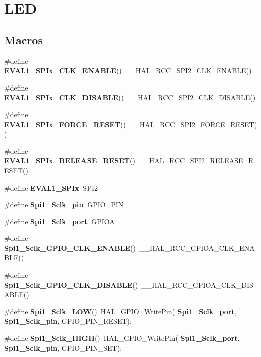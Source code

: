 \section{L\+ED}
\label{group___l_e_d}
\subsection*{Macros}
\begin{DoxyCompactItemize}
\item 
\#define \textbf{ E\+V\+A\+L1\+\_\+\+S\+P\+Ix\+\_\+\+C\+L\+K\+\_\+\+E\+N\+A\+B\+LE}()~\+\_\+\+\_\+\+H\+A\+L\+\_\+\+R\+C\+C\+\_\+\+S\+P\+I2\+\_\+\+C\+L\+K\+\_\+\+E\+N\+A\+B\+LE()
\item 
\#define \textbf{ E\+V\+A\+L1\+\_\+\+S\+P\+Ix\+\_\+\+C\+L\+K\+\_\+\+D\+I\+S\+A\+B\+LE}()~\+\_\+\+\_\+\+H\+A\+L\+\_\+\+R\+C\+C\+\_\+\+S\+P\+I2\+\_\+\+C\+L\+K\+\_\+\+D\+I\+S\+A\+B\+LE()
\item 
\#define \textbf{ E\+V\+A\+L1\+\_\+\+S\+P\+Ix\+\_\+\+F\+O\+R\+C\+E\+\_\+\+R\+E\+S\+ET}()~\+\_\+\+\_\+\+H\+A\+L\+\_\+\+R\+C\+C\+\_\+\+S\+P\+I2\+\_\+\+F\+O\+R\+C\+E\+\_\+\+R\+E\+S\+ET()
\item 
\#define \textbf{ E\+V\+A\+L1\+\_\+\+S\+P\+Ix\+\_\+\+R\+E\+L\+E\+A\+S\+E\+\_\+\+R\+E\+S\+ET}()~\+\_\+\+\_\+\+H\+A\+L\+\_\+\+R\+C\+C\+\_\+\+S\+P\+I2\+\_\+\+R\+E\+L\+E\+A\+S\+E\+\_\+\+R\+E\+S\+ET()
\item 
\#define \textbf{ E\+V\+A\+L1\+\_\+\+S\+P\+Ix}~S\+P\+I2
\item 
\#define \textbf{ Spi1\+\_\+\+Sclk\+\_\+pin}~G\+P\+I\+O\+\_\+\+P\+I\+N\+\_
\item 
\#define \textbf{ Spi1\+\_\+\+Sclk\+\_\+port}~G\+P\+I\+OA
\item 
\#define \textbf{ Spi1\+\_\+\+Sclk\+\_\+\+G\+P\+I\+O\+\_\+\+C\+L\+K\+\_\+\+E\+N\+A\+B\+LE}()~\+\_\+\+\_\+\+H\+A\+L\+\_\+\+R\+C\+C\+\_\+\+G\+P\+I\+O\+A\+\_\+\+C\+L\+K\+\_\+\+E\+N\+A\+B\+LE()
\item 
\#define \textbf{ Spi1\+\_\+\+Sclk\+\_\+\+G\+P\+I\+O\+\_\+\+C\+L\+K\+\_\+\+D\+I\+S\+A\+B\+LE}()~\+\_\+\+\_\+\+H\+A\+L\+\_\+\+R\+C\+C\+\_\+\+G\+P\+I\+O\+A\+\_\+\+C\+L\+K\+\_\+\+D\+I\+S\+A\+B\+LE()
\item 
\#define \textbf{ Spi1\+\_\+\+Sclk\+\_\+\+L\+OW}()~H\+A\+L\+\_\+\+G\+P\+I\+O\+\_\+\+Write\+Pin(\textbf{ Spi1\+\_\+\+Sclk\+\_\+port},\textbf{ Spi1\+\_\+\+Sclk\+\_\+pin}, G\+P\+I\+O\+\_\+\+P\+I\+N\+\_\+\+R\+E\+S\+ET);
\item 
\#define \textbf{ Spi1\+\_\+\+Sclk\+\_\+\+H\+I\+GH}()~H\+A\+L\+\_\+\+G\+P\+I\+O\+\_\+\+Write\+Pin(\textbf{ Spi1\+\_\+\+Sclk\+\_\+port},\textbf{ Spi1\+\_\+\+Sclk\+\_\+pin}, G\+P\+I\+O\+\_\+\+P\+I\+N\+\_\+\+S\+ET);

\end{DoxyCompactItemize}
